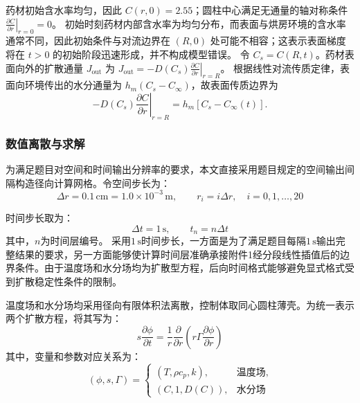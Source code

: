 \documentclass[withoutpreface,bwprint]{cumcmthesis}
\begin{document}
药材初始含水率均匀，因此 $C(r,0)=2.55$；圆柱中心满足无通量的轴对称条件 $\left.\frac{\partial C}{\partial r}\right|_{r=0}=0$。
初始时刻药材内部含水率为均匀分布，而表面与烘房环境的含水率通常不同，因此初始条件与对流边界在 $(R,0)$ 处可能不相容；这表示表面梯度将在 $t>0$ 的初始阶段迅速形成，并不构成模型错误。
令 $C_s=C(R,t)$。药材表面向外的扩散通量 $J_{\mathrm{out}}$ 为 $J_{\mathrm{out}}=-D(C_s)\left.\frac{\partial C}{\partial r}\right|_{r=R}$。
根据线性对流传质定律，表面向环境传出的水分通量为 $h_m(C_s-C_\infty)$，故表面传质边界为
\begin{equation}
-D(C_s)\left.\frac{\partial C}{\partial r}\right|_{r=R}
=h_m\left[C_s-C_\infty(t)\right].
\end{equation}

\subsubsection{数值离散与求解}

为满足题目对空间和时间输出分辨率的要求，本文直接采用题目规定的空间输出间隔构造径向计算网格。令空间步长为：
\begin{equation}
\Delta r=0.1\,\mathrm{cm}=1.0\times10^{-3}\,\mathrm{m},
\qquad
r_i=i\Delta r,\quad i=0,1,\ldots,20
\label{eq:q1-space-grid}
\end{equation}

时间步长取为：
\begin{equation}
\Delta t=1\,\mathrm{s},
\qquad
t_n=n\Delta t
\label{eq:q1-time-grid}
\end{equation}
其中，$n$为时间层编号。
采用$1\,\mathrm{s}$时间步长，一方面是为了满足题目每隔$1\,\mathrm{s}$输出完整结果的要求，另一方面能够使计算时间层准确承接附件1经分段线性插值后的边界条件。由于温度场和水分场均为扩散型方程，后向时间格式能够避免显式格式受到扩散稳定性条件的限制。

温度场和水分场均采用径向有限体积法离散，控制体取同心圆柱薄壳。为统一表示两个扩散方程，将其写为：
\begin{equation}
s\frac{\partial\phi}{\partial t}
=
\frac{1}{r}
\frac{\partial}{\partial r}
\left(
r\Gamma\frac{\partial\phi}{\partial r}
\right)
\label{eq:q1-unified-pde}
\end{equation}
其中，变量和参数对应关系为：
\begin{equation}
(\phi,s,\Gamma)=
\begin{cases}
(T,\rho c_p,k),&\text{温度场},\\
(C,1,D(C)),&\text{水分场}
\end{cases}
\label{eq:q1-unified-parameters}
\end{equation}
\end{document}
